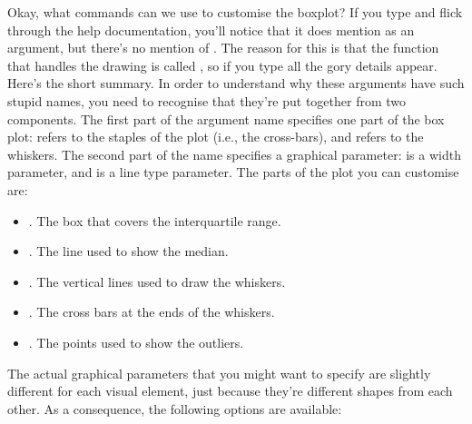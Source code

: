 Okay, what commands can we use to customise the boxplot? If you type  and flick through the help documentation, you'll notice that it does mention  as an argument, but there's no mention of . The reason for this is that the function that handles the drawing is called , so if you type  all the gory details appear. Here's the short summary. In order to understand why these arguments have such stupid names, you need to recognise that they're put together from two components. The first part of the argument name specifies one part of the box plot:  refers to the staples of the plot (i.e., the cross-bars), and  refers to the whiskers. The second part of the name specifies a graphical parameter:  is a width parameter, and  is a line type parameter. The parts of the plot you can customise are:
\begin{itemize} \itemsep 0pt
\item {}. The box that covers the interquartile range.
\item {}. The line used to show the median.
\item {}. The vertical lines used to draw the whiskers. 
\item {}. The cross bars at the ends of the whiskers.
\item {}. The points used to show the outliers.
\end{itemize}
The actual graphical parameters that you might want to specify are slightly different for each visual element, just because they're different shapes from each other. As a consequence, the following options are available:
